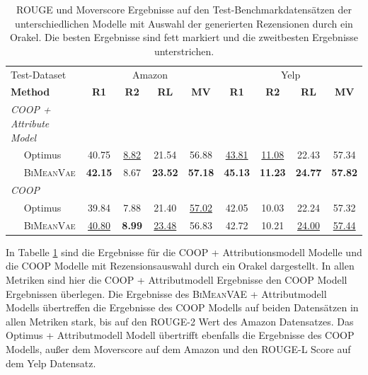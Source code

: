 \begin{table}[!h]
    \centering
    \begin{tabular}{@{}lcccc|cccc@{}}
    \toprule
             Test-Dataset                  & \multicolumn{4}{c}{Amazon} & \multicolumn{4}{c}{Yelp} \\ 
    \textbf{Method} & \textbf{R1} & \textbf{R2} & \textbf{RL} & \textbf{MV} & \textbf{R1} & \textbf{R2} & \textbf{RL} & \textbf{MV}\\ \midrule
      
    \textit{COOP + Attribute Model}        &         &         &        &        &        &   & &     \\
    $\quad$ Optimus                         & 40.75 & \underline{8.82} & 21.54 & 56.88 & \underline{43.81} & \underline{11.08} & 22.43 & 57.34 \\ 
    $\quad$ \textsc{BiMeanVae}              & \textbf{42.15} & 8.67 & \textbf{23.52} & \textbf{57.18} & \textbf{45.13} & \textbf{11.23} & \textbf{24.77} & \textbf{57.82} \\ \midrule
    
    \textit{COOP}                           &       &      &       &       &       &       &       &        \\ %
    $\quad$ Optimus                          & 39.84 & 7.88 & 21.40 & \underline{57.02} & 42.05 & 10.03 & 22.24 & 57.32\\ 
    $\quad$ \textsc{BiMeanVae}               & \underline{40.80} & \textbf{8.99} & \underline{23.48} & 56.83 & 42.72 & 10.21 & \underline{24.00} & \underline{57.44} \\ \bottomrule
    \end{tabular}
    \caption{ROUGE und Moverscore Ergebnisse auf den Test-Benchmarkdatensätzen der unterschiedlichen Modelle mit Auswahl der generierten Rezensionen durch ein Orakel. Die besten Ergebnisse sind fett markiert und die zweitbesten Ergebnisse unterstrichen.}
    \label{oracle_results}
\end{table}

In Tabelle \ref{oracle_results} sind die Ergebnisse für die COOP + Attributionsmodell Modelle und die COOP Modelle mit Rezensionsauswahl durch ein Orakel dargestellt.
In allen Metriken sind hier die COOP + Attributmodell Ergebnisse den COOP Modell Ergebnissen überlegen. 
Die Ergebnisse des \textsc{BiMeanVAE} + Attributmodell Modells übertreffen die Ergebnisse des COOP Modells auf beiden Datensätzen in allen Metriken stark, bis auf den ROUGE-2 Wert des Amazon Datensatzes.
Das Optimus + Attributmodell Modell übertrifft ebenfalls die Ergebnisse des COOP Modells, außer dem Moverscore auf dem Amazon und den ROUGE-L Score auf dem Yelp Datensatz.

